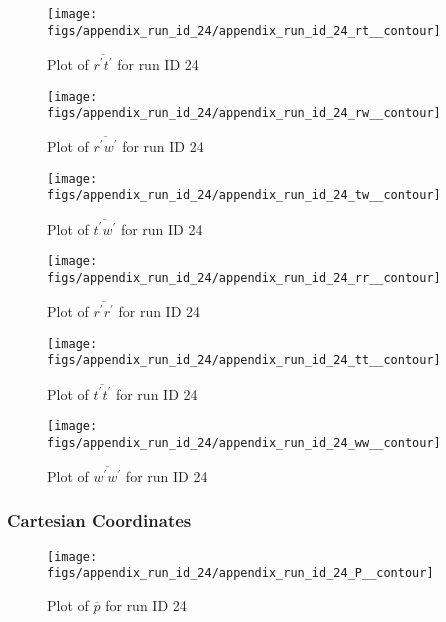 \begin{figure}[H]
\centering
\texttt{[image: figs/appendix\_run\_id\_24/appendix\_run\_id\_24\_rt\_\_contour]}
\caption{Plot of $\overline{r^\prime t^\prime}$ for run ID 24}
\label{fig:appendix_run_id_24_rt__contour}
\end{figure}


\begin{figure}[H]
\centering
\texttt{[image: figs/appendix\_run\_id\_24/appendix\_run\_id\_24\_rw\_\_contour]}
\caption{Plot of $\overline{r^\prime w^\prime}$ for run ID 24}
\label{fig:appendix_run_id_24_rw__contour}
\end{figure}


\begin{figure}[H]
\centering
\texttt{[image: figs/appendix\_run\_id\_24/appendix\_run\_id\_24\_tw\_\_contour]}
\caption{Plot of $\overline{t^\prime w^\prime}$ for run ID 24}
\label{fig:appendix_run_id_24_tw__contour}
\end{figure}


\begin{figure}[H]
\centering
\texttt{[image: figs/appendix\_run\_id\_24/appendix\_run\_id\_24\_rr\_\_contour]}
\caption{Plot of $\overline{r^\prime r^\prime}$ for run ID 24}
\label{fig:appendix_run_id_24_rr__contour}
\end{figure}


\begin{figure}[H]
\centering
\texttt{[image: figs/appendix\_run\_id\_24/appendix\_run\_id\_24\_tt\_\_contour]}
\caption{Plot of $\overline{t^\prime t^\prime}$ for run ID 24}
\label{fig:appendix_run_id_24_tt__contour}
\end{figure}


\begin{figure}[H]
\centering
\texttt{[image: figs/appendix\_run\_id\_24/appendix\_run\_id\_24\_ww\_\_contour]}
\caption{Plot of $\overline{w^\prime w^\prime}$ for run ID 24}
\label{fig:appendix_run_id_24_ww__contour}
\end{figure}


\subsubsection{Cartesian Coordinates}
\begin{figure}[H]
\centering
\texttt{[image: figs/appendix\_run\_id\_24/appendix\_run\_id\_24\_P\_\_contour]}
\caption{Plot of $\overline{p}$ for run ID 24}
\label{fig:appendix_run_id_24_P__contour}
\end{figure}


